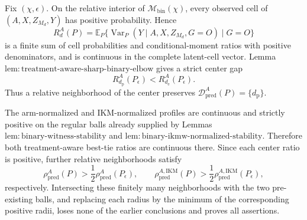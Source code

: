 Fix \((\chi,\epsilon)\).  On the relative interior of \(\mathcal M_{\mathrm{bin}}(\chi)\), every observed cell of \((A,X,Z_{M_d},Y)\) has positive probability.  Hence
\[
 R_d^A(P)=
 \mathbb E_P\{\operatorname{Var}_P(Y\mid A,X,Z_{M_d},G=O)\mid G=O\}
\]
is a finite sum of cell probabilities and conditional-moment ratios with positive denominators, and is continuous in the complete latent-cell vector.  Lemma~\(\mathrm{lem{:}treatment\text{-}aware\text{-}sharp\text{-}binary\text{-}elbow}\) gives a strict center gap
\[
 R_{d_{\mathrm p}}^A(P_\epsilon)<R_{d_{\mathrm e}}^A(P_\epsilon).
\]
Thus a relative neighborhood of the center preserves \(\mathcal D_{\mathrm{pred}}^A(P)=\{d_{\mathrm p}\}\).

The arm-normalized and IKM-normalized profiles are continuous and strictly positive on the regular balls already supplied by Lemmas~\(\mathrm{lem{:}binary\text{-}witness\text{-}stability}\) and \(\mathrm{lem{:}binary\text{-}ikmw\text{-}normalized\text{-}stability}\).  Therefore both treatment-aware best-tie ratios are continuous there.  Since each center ratio is positive, further relative neighborhoods satisfy
\[
 \rho_{\mathrm{pred}}^A(P)
 >\frac12\rho_{\mathrm{pred}}^A(P_\epsilon),
 \qquad
 \rho_{\mathrm{pred}}^{A,\mathrm{IKM}}(P)
 >\frac12\rho_{\mathrm{pred}}^{A,\mathrm{IKM}}(P_\epsilon),
\]
respectively.  Intersecting these finitely many neighborhoods with the two pre-existing balls, and replacing each radius by the minimum of the corresponding positive radii, loses none of the earlier conclusions and proves all assertions.